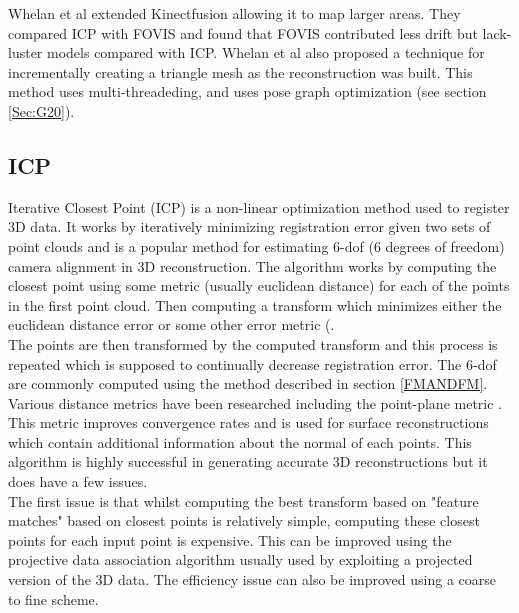 Whelan et al \cite{Whelan12Kintinuous} extended Kinectfusion allowing it to map larger areas. They compared ICP with FOVIS and found that FOVIS contributed less drift but lack-luster models compared with ICP. Whelan et al also proposed a technique for incrementally creating a triangle mesh as the reconstruction was built. This method uses multi-threadeding, and uses pose graph optimization (see section \ref{Sec:G20}).



\subsection{ICP}

Iterative Closest Point (ICP) \cite{Besl92Method,Rusinkiewicz01Efficient,Segal09Generalized} is a non-linear optimization method used to register 3D data. It works by iteratively minimizing registration error given two sets of point clouds and is a popular method for estimating 6-dof (6 degrees of freedom) camera alignment in 3D reconstruction. The algorithm works by computing the closest point using some metric (usually euclidean distance) for each of the points in the first point cloud. Then computing a transform which minimizes either the euclidean distance error or some other error metric (\cite{Steinbrucker11Real,Tykkala11Direct,Kerl13Robust,Chen92Object,Stuckler12Robust}. \\

The points are then transformed by the computed transform and this process is repeated which is supposed to continually decrease registration error. The 6-dof are commonly computed using the method described in section \ref{FMANDFM}. Various distance metrics have been researched including the point-plane metric \cite{Chen92Object}. This metric improves convergence rates and is used for surface reconstructions which contain additional information about the normal of each points. This algorithm is highly successful in generating accurate 3D reconstructions but it does have a few issues. \\

The first issue is that whilst computing the best transform based on "feature matches" based on closest points is relatively simple, computing these closest points for each input point is expensive. This can be improved using the projective data association algorithm \cite{Blais95Registering} usually used by exploiting a projected version of the 3D data. The efficiency issue can also be improved using a coarse to fine scheme. \\

